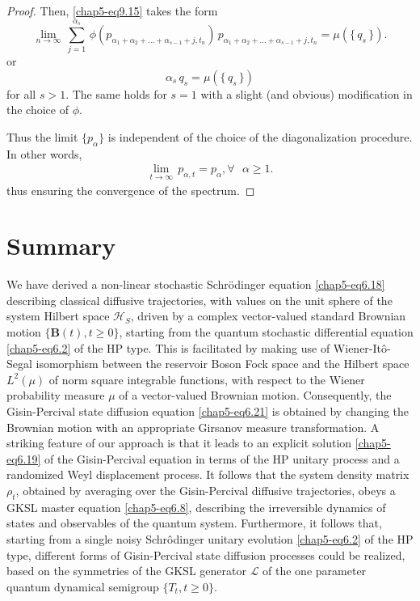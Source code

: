 \begin{proof}
Then, \eqref{chap5-eq9.15} takes the form 
\begin{equation}
	\underset{n\rightarrow\infty}{\lim}\, \sum_{j=1}^{\alpha_s}\, \phi(p_{\alpha_1+\alpha_2+\ldots +\alpha_{s-1}+j, t_n})\, p_{\alpha_1+\alpha_2+\ldots +\alpha_{s-1}+j, t_n}=\mu\left( \{\,q_s\,\} \right). \label{chap5-eq9.17}
\end{equation}
or 
$$
\alpha_s\, q_s=\mu\left( \{\,q_s\,\}\right)
$$
for all $s>1$. The same holds for $s=1$ with a slight (and obvious) modification in the choice of $\phi$. 

Thus the limit $\{p_\alpha\}$  is independent of  the choice of the  diagonalization procedure. In other words, 
\begin{eqnarray*} 
	\underset{t\rightarrow\infty}{\lim}\, p_{\alpha, t}=p_\alpha,  \forall \ \ \ \alpha\geq 1.
\end{eqnarray*}
thus ensuring the convergence of the spectrum.
\end{proof}

\section{Summary} \label{chap5-sec10}

We have derived a non-linear stochastic Schr{\"o}dinger equation \eqref{chap5-eq6.18} describing classical diffusive trajectories, with values on the unit sphere of the system Hilbert space $\mathcal{H}_S$, driven by a complex vector-valued standard Brownian motion $\{\mathbf{B}(t), t\geq 0\}$, starting from the quantum stochastic differential equation \eqref{chap5-eq6.2} of the HP type. This is facilitated by making use of  Wiener-It{\^o}-Segal isomorphism between the reservoir Boson Fock space and the Hilbert space $L^2(\mu)$ of norm square integrable functions, with respect to the Wiener probability measure $\mu$ of a vector-valued Brownian motion. Consequently, the Gisin-Percival state diffusion equation \eqref{chap5-eq6.21} is obtained by changing the Brownian motion with an appropriate Girsanov measure transformation. A striking feature of our approach is that it leads to an explicit solution \eqref{chap5-eq6.19} of the Gisin-Percival equation in terms of the HP unitary process and a randomized Weyl displacement process. It follows that the system density matrix $\rho_t$, obtained by averaging over the Gisin-Percival diffusive trajectories, obeys a GKSL master equation \eqref{chap5-eq6.8}, describing the irreversible dynamics of  states and  observables of the quantum system. Furthermore, it follows that, starting from a single noisy Schr{\^o}dinger unitary evolution \eqref{chap5-eq6.2} of the HP type, different forms of Gisin-Percival state diffusion processes could be realized, based on the symmetries of the GKSL generator $\mathcal{L}$ of the one parameter quantum dynamical semigroup $\{T_t, t\geq 0\}$.

